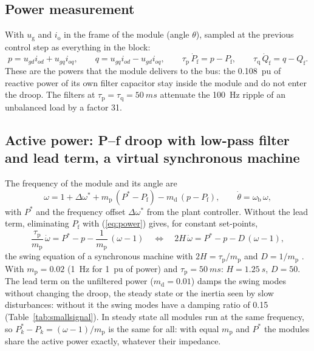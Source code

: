 \documentclass[11pt,a4paper]{scrartcl}
\newcommand{\ped}[1]{_{\mathrm{#1}}}
\begin{document}
\begin{onehalfspace}
\subsection{Power measurement}

With $u\ped{g}$ and $i\ped{o}$ in the frame of the module (angle $\theta$), sampled at the previous control step as everything in the block:
\begin{equation}
	p = u_{gd} i_{od} + u_{gq} i_{oq}, \qquad q = u_{gq} i_{od} - u_{gd} i_{oq}, \qquad
	\tau\ped{p}\,\dot P\ped{f} = p - P\ped{f}, \qquad \tau\ped{q}\,\dot Q\ped{f} = q - Q\ped{f}.
	\label{eq:power}
\end{equation}
These are the powers that the module delivers to the bus: the \SI{0.108}{pu} of reactive power of its own filter capacitor stay inside the module and do not enter the droop. The filters at $\tau\ped{p} = \tau\ped{q} = \SI{50}{ms}$ attenuate the \SI{100}{Hz} ripple of an unbalanced load by a factor 31.

\subsection{Active power: P--f droop with low-pass filter and lead term, a virtual synchronous machine}

The frequency of the module and its angle are
\begin{equation}
	\omega = 1 + \Delta\omega^* + m\ped{p}\,(P^* - P\ped{f}) - m\ped{d}\,(p - P\ped{f}), \qquad \dot\theta = \omega\ped{b}\,\omega ,
	\label{eq:pf}
\end{equation}
with $P^*$ and the frequency offset $\Delta\omega^*$ from the plant controller. Without the lead term, eliminating $P\ped{f}$ with (\ref{eq:power}) gives, for constant set-points,
\begin{equation}
	\frac{\tau\ped{p}}{m\ped{p}}\,\dot\omega = P^* - p - \frac{1}{m\ped{p}}\,(\omega - 1)
	\quad\Longleftrightarrow\quad
	2H\,\dot\omega = P^* - p - D\,(\omega - 1),
	\label{eq:vsm}
\end{equation}
the swing equation of a synchronous machine with $2H = \tau\ped{p}/m\ped{p}$ and $D = 1/m\ped{p}$ \cite{darco2014}. With $m\ped{p} = 0.02$ (\SI{1}{Hz} for \SI{1}{pu} of power) and $\tau\ped{p} = \SI{50}{ms}$: $H = \SI{1.25}{s}$, $D = 50$. The lead term on the unfiltered power ($m\ped{d} = 0.01$) damps the swing modes without changing the droop, the steady state or the inertia seen by slow disturbances: without it the swing modes have a damping ratio of 0.15 (Table~\ref{tab:smallsignal}). In steady state all modules run at the same frequency, so $P^*_k - P_k = (\omega - 1)/m\ped{p}$ is the same for all: with equal $m\ped{p}$ and $P^*$ the modules share the active power exactly, whatever their impedance.


\end{onehalfspace}
\end{document}
